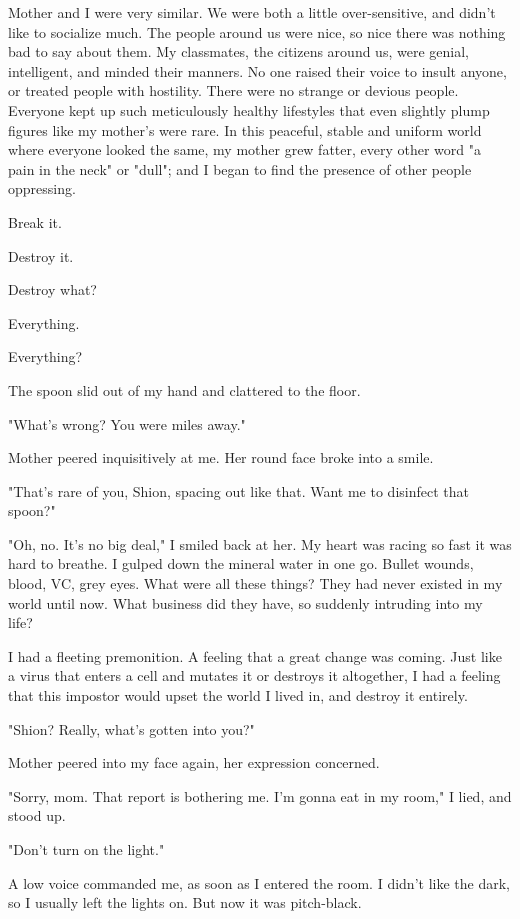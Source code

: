 Mother and I were very similar. We were both a little over-sensitive,
and didn't like to socialize much. The people around us were nice, so
nice there was nothing bad to say about them. My classmates, the
citizens around us, were genial, intelligent, and minded their manners.
No one raised their voice to insult anyone, or treated people with
hostility. There were no strange or devious people. Everyone kept up
such meticulously healthy lifestyles that even slightly plump figures
like my mother's were rare. In this peaceful, stable and uniform world
where everyone looked the same, my mother grew fatter, every other word
"a pain in the neck" or "dull"; and I began to find the presence of
other people oppressing.

Break it.

Destroy it.

Destroy what?

Everything.

Everything?

The spoon slid out of my hand and clattered to the floor.

"What's wrong? You were miles away."

Mother peered inquisitively at me. Her round face broke into a smile.

"That's rare of you, Shion, spacing out like that. Want me to disinfect
that spoon?"

"Oh, no. It's no big deal," I smiled back at her. My heart was racing so
fast it was hard to breathe. I gulped down the mineral water in one go.
Bullet wounds, blood, VC, grey eyes. What were all these things? They
had never existed in my world until now. What business did they have, so
suddenly intruding into my life?

I had a fleeting premonition. A feeling that a great change was coming.
Just like a virus that enters a cell and mutates it or destroys it
altogether, I had a feeling that this impostor would upset the world I
lived in, and destroy it entirely.

"Shion? Really, what's gotten into you?"

Mother peered into my face again, her expression concerned.

"Sorry, mom. That report is bothering me. I'm gonna eat in my room," I
lied, and stood up.

"Don't turn on the light."

A low voice commanded me, as soon as I entered the room. I didn't like
the dark, so I usually left the lights on. But now it was pitch-black.

